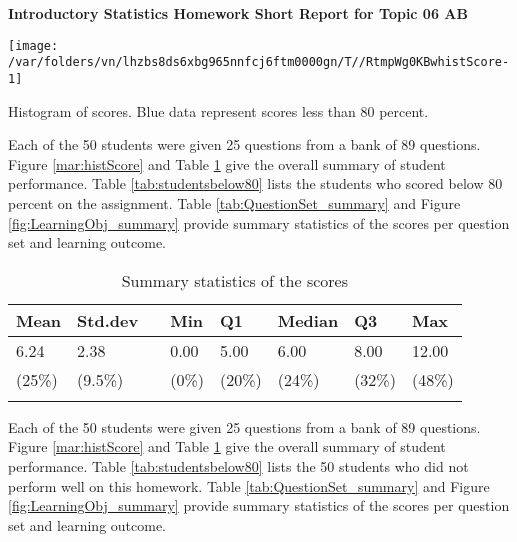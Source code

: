 \documentclass[12pt,english,nohyper]{tufte-handout}\usepackage[]{graphicx}\usepackage[]{color}
\newenvironment{knitrout}{}{} %
\begin{document}
\setcaptionfont{
  \normalfont\footnotesize
  \color{black}
}





\centerline{\Large\bf Introductory Statistics Homework Short Report for Topic 06 AB}
\vspace{1cm}

\begin{knitrout}
\color{fgcolor}\begin{marginfigure}
\texttt{[image: /var/folders/vn/lhzbs8ds6xbg965nnfcj6ftm0000gn/T//RtmpWg0KBwhistScore-1]} \caption[Histogram of scores]{Histogram of scores. Blue data represent scores less than 80 percent.}\label{mar:histScore}
\end{marginfigure}


\end{knitrout}

Each of the 50 students were given 25 questions from a bank of 89 questions. Figure \ref{mar:histScore} and Table \ref{tab:summary} give the overall summary of student performance. Table \ref{tab:studentsbelow80} lists the students who scored below 80 percent on the assignment. Table \ref{tab:QuestionSet_summary} and Figure \ref{fig:LearningObj_summary} provide summary statistics of the scores per question set and learning outcome.
\bigskip{}

\begin{longtable}{llllllll}
  \hline
Mean & Std.dev &   & Min & Q1 & Median & Q3 & Max \\ 
  \hline
6.24 & 2.38 &  & 0.00 & 5.00 & 6.00 & 8.00 & 12.00 \\ 
  (25\%) & (9.5\%) &  & (0\%) & (20\%) & (24\%) & (32\%) & (48\%) \\ 
   \hline
\hline
\caption{Summary statistics of the scores} 
\label{tab:summary}
\end{longtable}




\newif\ifPositive

\Positivetrue

\ifPositive
Each of the 50 students were given 25 questions from a bank of 89 questions. Figure \ref{mar:histScore} and Table \ref{tab:summary} give the overall summary of student performance. Table \ref{tab:studentsbelow80} lists the 50 students who did not perform well on this homework. Table \ref{tab:QuestionSet_summary} and Figure \ref{fig:LearningObj_summary} provide summary statistics of the scores per question set and learning outcome.
\else
Each of the 50 students were given 25 questions from a bank of 89 questions. Figure \ref{mar:histScore} and Table \ref{tab:summary} give the overall summary of student performance. Table \ref{tab:QuestionSet_summary} and Figure \ref{fig:LearningObj_summary} provide summary statistics of the scores per question set and learning outcome.
\fi
\end{document}
